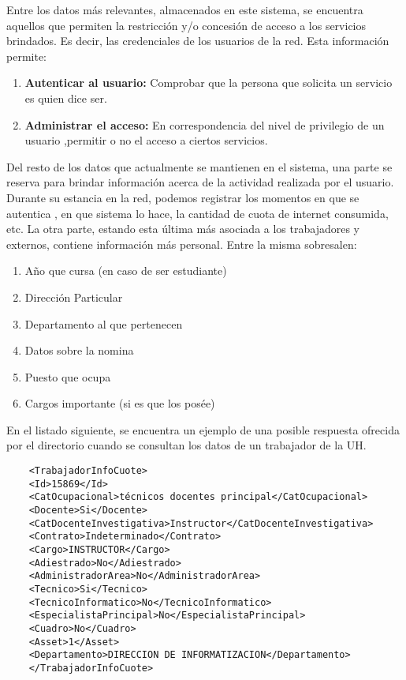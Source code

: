Entre los datos más relevantes, almacenados en este sistema, se encuentra aquellos que 
permiten la restricción y/o concesión de acceso a los servicios brindados. Es decir, las 
credenciales de los usuarios de la red. Esta información permite:

\begin{enumerate}
\item {\bf Autenticar al usuario:} Comprobar que la persona que solicita un servicio es 
quien dice ser.
\item {\bf Administrar el acceso:} En correspondencia del nivel de privilegio de un usuario 
,permitir o no el acceso a ciertos servicios.
\end{enumerate}

Del resto de los datos que actualmente se mantienen en el sistema, una parte se reserva 
para brindar información acerca de la actividad realizada por el usuario. Durante su 
estancia en la red, podemos registrar los momentos en que se autentica , en que sistema lo 
hace, la cantidad de cuota de internet consumida, etc. La otra parte, estando esta última 
más asociada a los trabajadores y externos, contiene información más personal. Entre la 
misma sobresalen: 

\begin{enumerate}
	\item Año que cursa (en caso de ser estudiante)
	\item Direcci\'on Particular
	\item Departamento al que pertenecen
	\item Datos sobre la nomina
	\item Puesto que ocupa
	\item Cargos importante (si es que los pos\'ee)
\end{enumerate}

En el listado siguiente, se encuentra un ejemplo de una posible respuesta ofrecida por el 
directorio cuando se consultan los datos de un trabajador de la UH.

\begin{verbatim}
	<TrabajadorInfoCuote>
	<Id>15869</Id>
	<CatOcupacional>técnicos docentes principal</CatOcupacional>
	<Docente>Si</Docente>
	<CatDocenteInvestigativa>Instructor</CatDocenteInvestigativa>
	<Contrato>Indeterminado</Contrato>
	<Cargo>INSTRUCTOR</Cargo>
	<Adiestrado>No</Adiestrado>
	<AdministradorArea>No</AdministradorArea>
	<Tecnico>Si</Tecnico>
	<TecnicoInformatico>No</TecnicoInformatico>
	<EspecialistaPrincipal>No</EspecialistaPrincipal>
	<Cuadro>No</Cuadro>
	<Asset>1</Asset>
	<Departamento>DIRECCION DE INFORMATIZACION</Departamento>
	</TrabajadorInfoCuote>
\end{verbatim}

